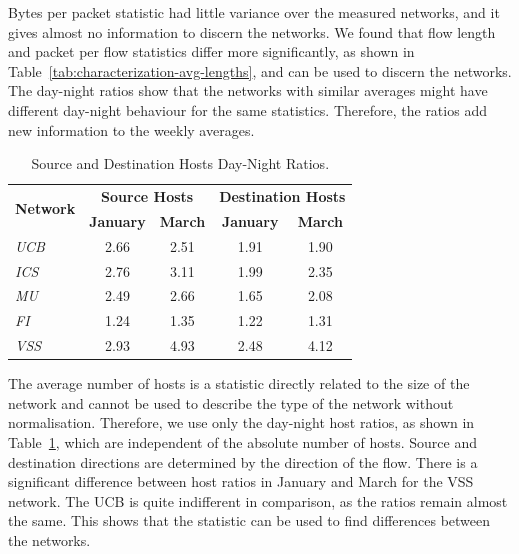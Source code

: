 Bytes per packet statistic had little variance over the measured networks, and it gives almost no information to discern the networks. We found that flow length and packet per flow statistics differ more significantly, as shown in Table~\ref{tab:characterization-avg-lengths}, and can be used to discern the networks. The day-night ratios show that the networks with similar averages might have different day-night behaviour for the same statistics. Therefore, the ratios add new information to the weekly averages.

\begin{table}[!t]
        \centering
        \renewcommand{\arraystretch}{1.1}
        \begin{tabular}{|l|c|c|c|c|} \hline
                \multirow{2}{*}{\centering\textbf{Network}} & \multicolumn{2}{c|}{\textbf{Source Hosts}} & \multicolumn{2}{c|}{\textbf{Destination Hosts}} \\ \cline{2-5}
                  & \textbf{January} & \textbf{March} & \textbf{January} & \textbf{March} \\ \hline
                
                \textit{UCB} & 2.66 & 2.51 & 1.91 & 1.90 \\ \hline
                \textit{ICS} & 2.76 & 3.11 & 1.99 & 2.35 \\ \hline
                 \textit{MU} & 2.49 & 2.66 & 1.65 & 2.08 \\ \hline
                \textit{FI} & 1.24 & 1.35 & 1.22  & 1.31 \\ \hline
                \textit{VSS} & 2.93 & 4.93 & 2.48 & 4.12 \\ \hline
        \end{tabular}
        \caption{Source and Destination Hosts Day-Night Ratios.}
        \label{tab:characterization-day-night-hosts-ratio}
\end{table}

The average number of hosts is a statistic directly related to the size of the network and cannot be used to describe the type of the network without normalisation. Therefore, we use only the day-night host ratios, as shown in Table~\ref{tab:characterization-day-night-hosts-ratio}, which are independent of the absolute number of hosts. Source and destination directions are determined by the direction of the flow. There is a significant difference between host ratios in January and March for the VSS network. The UCB is quite indifferent in comparison, as the ratios remain almost the same. This shows that the statistic can be used to find differences between the networks.


